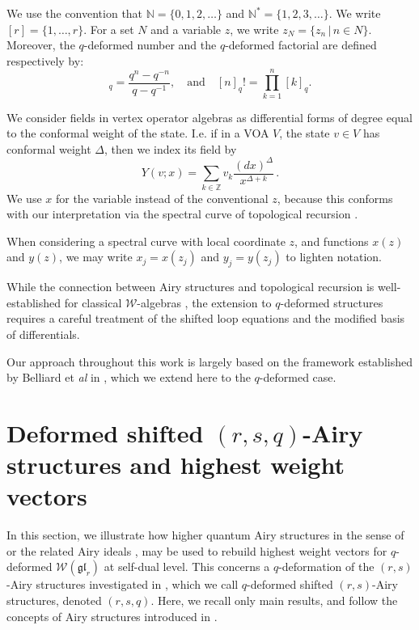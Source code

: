 \documentclass[reqno,11pt]{amsart}
\theoremstyle{plain}
\theoremstyle{definition}
\theoremstyle{remark}
\numberwithin{equation}{section}
\newcommand{\mb}[1]{\mathbb{#1}}
\newcommand{\1}{\mathds{1}}
\newcommand{\Z}{\mb{Z}}
\newcommand{\2}{\frac{1}{2}}
\begin{document}
	We use the convention that $\mathbb{N} = \{0,1,2,\ldots \}$ and $\mathbb{N}^* = \{1,2,3,\ldots \}$. We write $[r] = \{1,\ldots, r\}$. For a set $ N$ and a variable $z$, we write $ z_N = \{ z_n \, | \, n \in N \}$. Moreover, the $q$-deformed number and the $q$-deformed factorial are defined respectively by\cite{Kac2002}:
	\begin{equation}
		[n]_q=\frac{q^n-q^{-n}}{q-q^{-1}},\quad\mbox{and}\quad [n]_q!=\prod_{k=1}^{n}[k]_q.
	\end{equation}
	
	We consider fields in vertex operator algebras as differential forms of degree equal to the conformal weight of the state. I.e. if in a VOA $V$, the state $ v \in V$ has conformal weight $ \Delta$, then we index its field by
	\begin{equation}
		Y(v;x) = \sum_{k \in \Z} v_k \frac{(dx)^\Delta}{x^{\Delta + k}}\,.
	\end{equation}
	We use $x$ for the variable instead of the conventional $ z$, because this conforms with our interpretation via the spectral curve of topological recursion \cite{BKS23}.
	
	When considering a spectral curve with local coordinate $ z$, and functions $  x(z)$ and $ y(z)$, we may write $ x_j = x(z_j)$ and $ y_j = y(z_j)$ to lighten notation.
	
	While the connection between Airy structures and topological recursion is well-established for classical $\mathcal{W}$-algebras \cite{BKS23, BBCCN18}, the extension to $q$-deformed structures requires a careful treatment of the shifted loop equations and the modified basis of differentials.
	
	Our approach throughout this work is largely based on the framework established by Belliard  et {\it al } in \cite{BBKN25}, which we extend here to the $q$-deformed case.
	\section{Deformed shifted $(r,s,q)$-Airy structures and highest weight vectors}\label{s:shifted}
				In this section, we illustrate how  higher quantum Airy structures in the sense of \cite{BBCCN18,KS17} or  the related Airy ideals \cite{BCJ22}, may be used to rebuild highest weight vectors for $q$-deformed  $\mathcal{W}(\mathfrak{gl}_r)$ at self-dual level. This concerns a $q$-deformation of the $(r,s)$-Airy structures investigated in \cite{BBCCN18}, which we call  $q$-deformed shifted $(r,s)$-Airy structures, denoted $(r,s,q)$. Here, we recall only main results, and follow the concepts of Airy structures introduced in \cite{Bo24,BCJ22}.
\end{document}
